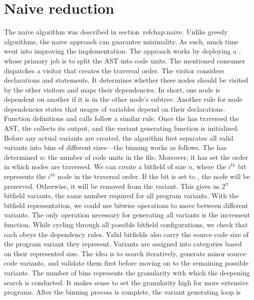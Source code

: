 \section{Naive reduction}

The naive algorithm was described in section~ref{chap:naive}.
Unlike greedy algorithms, the naive approach can guarantee minimality.
As such, much time went into improving the implementation.
The approach works by deploying a , whose 
primary job is to split the AST into code units.
The mentioned consumer dispatches a visitor that creates the traversal order.
The visitor considers declarations and statements.
It determines whether these nodes should be visited by the other visitors and 
maps their dependencies.
In short, one node is dependent on another if it is in the other node's 
subtree.
Another rule for node dependencies states that usages of variables depend on 
their declarations.
Function definitions and calls follow a similar rule.
Once the  has traversed the AST, 
the  collects its output, and the variant 
generating function is initialized.
Before any actual variants are created, the algorithm first separates all 
valid variants into bins of different sizes—the binning works as follows.
The  has determined $n$: the number of code 
units in the file.
Moreover, it has set the order in which nodes are traversed.
We can create a bitfield of size $n$, where the $i^{th}$ bit represents 
the $i^{th}$ node in the traversal order.
If the bit is set to , the node will be preserved.
Otherwise, it will be removed from the variant.
This gives us $2^n$ bitfield variants, the same number required for all 
program variants.
With the bitfield representation, we could use bitwise operations to move 
between different variants.
The only operation necessary for generating all variants is the increment 
function.
While cycling through all possible bitfield configurations, we check that 
each obeys the dependency rules.
Valid bitfields also carry the source code size of the program variant they 
represent.
Variants are assigned into categories based on their represented size.
The idea is to search iteratively, generate minor source code variants, and 
validate them first before moving on to the remaining possible variants.
The number of bins represents the granularity with which the deepening 
search is conducted.
It makes sense to set the granularity high for more extensive programs.
After the binning process is complete, the variant generating loop is 

